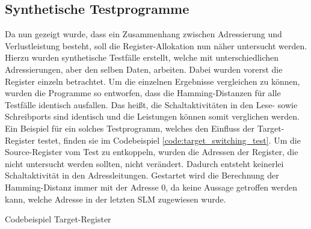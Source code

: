 \subsection{Synthetische Testprogramme}
Da nun gezeigt wurde, dass ein Zusammenhang zwischen Adressierung und Verlustleistung besteht, soll die Register-Allokation nun näher untersucht werden. Hierzu wurden synthetische Testfälle erstellt, welche mit unterschiedlichen Adressierungen, aber den selben Daten, arbeiten. Dabei wurden vorerst die Register einzeln betrachtet. Um die einzelnen Ergebnisse vergleichen zu können, wurden die Programme so entworfen, dass die Hamming-Distanzen für alle Testfälle identisch ausfallen. Das heißt, die Schaltaktivitäten in den Lese- sowie Schreibports sind identisch und die Leistungen können somit verglichen werden. Ein Beispiel für ein solches Testprogramm, welches den Einfluss der Target-Register testet, finden sie im Codebeispiel \ref{code:target_switching_test}. Um die Source-Register vom Test zu entkoppeln, wurden die Adressen der Register, die nicht untersucht werden sollten, nicht verändert. Dadurch entsteht keinerlei Schaltaktivität in den Adressleitungen. Gestartet wird die Berechnung der Hamming-Distanz immer mit der Adresse 0, da keine Aussage getroffen werden kann, welche Adresse in der letzten SLM zugewiesen wurde.

\begin{algorithm}[H]
	\begin{algorithmic}[1]
		\caption{Codebeispiel Target-Register }
		\label{code:target_switching_test}
	\end{algorithmic}
\end{algorithm}

